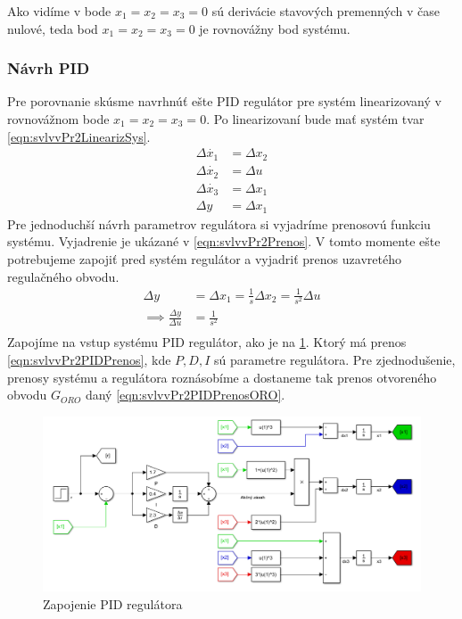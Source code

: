 \documentclass[../main.tex]{subfiles}
\begin{document}
		Ako vidíme v bode $x_1 = x_2 = x_3 = 0 $ sú derivácie stavových premenných v čase nulové, teda bod $x_1 = x_2 = x_3 = 0 $ je rovnovážny bod systému.
	\subsubsection{Návrh PID}		
	Pre porovnanie skúsme navrhnúť ešte PID regulátor pre systém linearizovaný v rovnovážnom bode $x_1 = x_2 = x_3 = 0$. Po linearizovaní bude mať systém tvar \cref{eqn:svlvvPr2LinearizSys}. 
	\begin{equation}
	\begin{aligned}
	\Delta \dot{x_1}  &= \Delta x_2 \\
	\Delta \dot{x_2} &= \Delta u \\
	\Delta \dot{x_3} &= \Delta x_1 \\
	\Delta y &= \Delta  x_1
	\end{aligned}
	\label{eqn:svlvvPr2LinearizSys}
	\end{equation}	
	Pre jednoduchší návrh parametrov regulátora si vyjadríme prenosovú funkciu systému. Vyjadrenie je ukázané v \cref{eqn:svlvvPr2Prenos}. V tomto momente ešte potrebujeme zapojiť pred systém regulátor a vyjadriť prenos uzavretého regulačného obvodu.
	\begin{equation}
	\begin{aligned}
	\Delta  y &= \Delta x_1 = \frac{1}{s}  \Delta x_2 = \frac{1}{s^2}  \Delta u \\
	\implies \frac{\Delta y}{\Delta u } &= \frac{1}{s^2} \\
	\end{aligned}
	\label{eqn:svlvvPr2Prenos}
	\end{equation}
	Zapojíme na vstup systému PID regulátor, ako je na \cref{fig:svlvvPr2ZapPID}. Ktorý má prenos \cref{eqn:svlvvPr2PIDPrenos}, kde $P, D, I$ sú parametre regulátora. Pre zjednodušenie, prenosy systému a regulátora roznásobíme a dostaneme tak prenos otvoreného obvodu $G_{ORO}$ daný \cref{eqn:svlvvPr2PIDPrenosORO}. 
	\begin{figure}[h!]
		\centering
		\includegraphics[width=0.8\linewidth]{svlvvPr2ZapPID}
		\caption{Zapojenie PID regulátora}
		\label{fig:svlvvPr2ZapPID}
	\end{figure}
\end{document}

